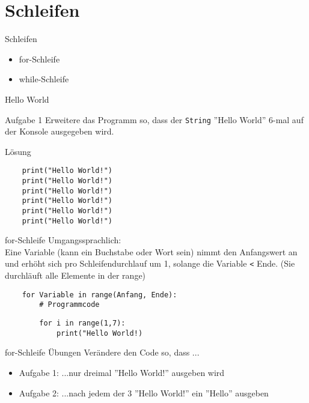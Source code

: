 \section{Schleifen}

\begin{frame}{Schleifen}
\begin{itemize}
	\item for-Schleife
	\item while-Schleife
\end{itemize}
\end{frame}


\begin{frame}[fragile]{Hello World}
\begin{block}{Aufgabe 1}
	Erweitere das Programm so, dass der \texttt{String} ''Hello World''
	6-mal auf der Konsole ausgegeben wird.
\end{block}
\pause{}
\begin{exampleblock}{Lösung}
	\begin{lstlisting}
	print("Hello World!")
	print("Hello World!")
	print("Hello World!")
	print("Hello World!")
	print("Hello World!")
	print("Hello World!")
	\end{lstlisting}
\end{exampleblock}
\end{frame}


\begin{frame}[fragile]{for-Schleife}
	Umgangssprachlich: \\
	Eine Variable (kann ein Buchstabe oder Wort sein) nimmt den Anfangswert an und erhöht sich pro Schleifendurchlauf um 1, solange die Variable \texttt{<} Ende. (Sie durchläuft alle Elemente in der range)
	
	\begin{lstlisting}
	for Variable in range(Anfang, Ende):
		# Programmcode
	\end{lstlisting}
	
	\begin{lstlisting}
		for i in range(1,7):
			print("Hello World!)
	\end{lstlisting}	
\end{frame}

\begin{frame}[fragile]{for-Schleife Übungen}
Verändere den Code so, dass ...
\begin{itemize}
\item Aufgabe 1: ...nur dreimal ''Hello World!'' ausgeben wird\\
\item Aufgabe 2: ...nach jedem der 3 ''Hello World!'' ein ''Hello'' ausgeben
\end{itemize}
\end{frame}


